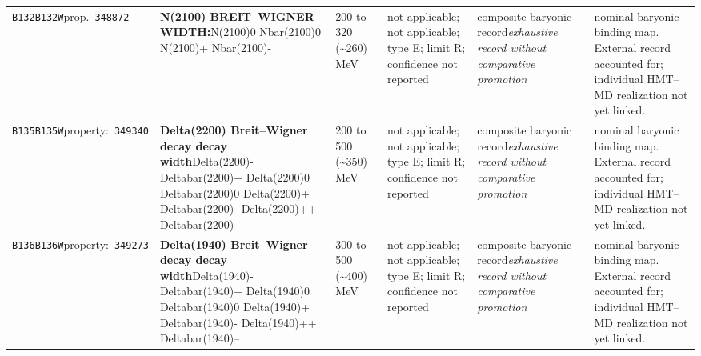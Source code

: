 \begin{landscape}
\begin{longtable}{L{1.85cm}L{4.45cm}L{2.35cm}L{4.05cm}L{3.35cm}L{7.15cm}}
\texttt{B132}\newline \texttt{B132W}\newline prop.\ \texttt{348872} & \textbf{N(2100) BREIT--WIGNER WIDTH:}\newline N(2100)0 \textbar{}\allowbreak{} Nbar(2100)0 \textbar{}\allowbreak{} N(2100)+ \textbar{}\allowbreak{} Nbar(2100)- & 200 to 320 (\textasciitilde{}260)\,MeV & not applicable; not applicable; type E; limit R; confidence not reported & composite baryonic record\newline \emph{exhaustive record without comparative promotion} & nominal baryonic binding map. External record accounted for; individual HMT--MD realization not yet linked. \\
\texttt{B135}\newline \texttt{B135W}\newline property:\ \texttt{349340} & \textbf{Delta(2200) Breit--Wigner decay decay width}\newline Delta(2200)- \textbar{}\allowbreak{} Deltabar(2200)+ \textbar{}\allowbreak{} Delta(2200)0 \textbar{}\allowbreak{} Deltabar(2200)0 \textbar{}\allowbreak{} Delta(2200)+ \textbar{}\allowbreak{} Deltabar(2200)- \textbar{}\allowbreak{} Delta(2200)++ \textbar{}\allowbreak{} Deltabar(2200)-- & 200 to 500 (\textasciitilde{}350)\,MeV & not applicable; not applicable; type E; limit R; confidence not reported & composite baryonic record\newline \emph{exhaustive record without comparative promotion} & nominal baryonic binding map. External record accounted for; individual HMT--MD realization not yet linked. \\
\texttt{B136}\newline \texttt{B136W}\newline property:\ \texttt{349273} & \textbf{Delta(1940) Breit--Wigner decay decay width}\newline Delta(1940)- \textbar{}\allowbreak{} Deltabar(1940)+ \textbar{}\allowbreak{} Delta(1940)0 \textbar{}\allowbreak{} Deltabar(1940)0 \textbar{}\allowbreak{} Delta(1940)+ \textbar{}\allowbreak{} Deltabar(1940)- \textbar{}\allowbreak{} Delta(1940)++ \textbar{}\allowbreak{} Deltabar(1940)-- & 300 to 500 (\textasciitilde{}400)\,MeV & not applicable; not applicable; type E; limit R; confidence not reported & composite baryonic record\newline \emph{exhaustive record without comparative promotion} & nominal baryonic binding map. External record accounted for; individual HMT--MD realization not yet linked. \\

\end{longtable}
\end{landscape}

